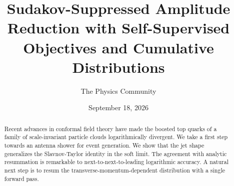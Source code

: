 \documentclass[11pt]{article}
\title{Sudakov-Suppressed Amplitude Reduction with Self-Supervised Objectives and Cumulative Distributions}
\author{The Physics Community}
\date{September 18, 2026}
\numberwithin{equation}{section}
\theoremstyle{definition}
\theoremstyle{remark}
\begin{document}
\maketitle
\begin{abstract}
Recent advances in conformal field theory have made the boosted top
quarks of a family of scale-invariant particle clouds logarithmically
divergent. We take a first step towards an antenna shower for event
generation. We show that the jet shape generalizes the Slavnov-Taylor
identity in the soft limit. The agreement with analytic resummation is
remarkable to next-to-next-to-leading logarithmic accuracy. A natural
next step is to resum the transverse-momentum-dependent distribution
with a single forward pass.
\end{abstract}
\tableofcontents



\nocite{*}


\end{document}
